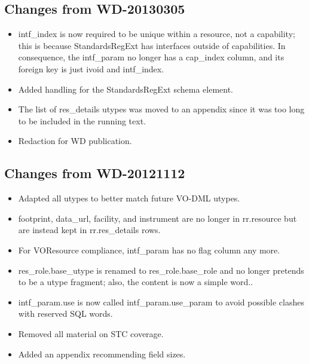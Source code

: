 \documentclass[11pt,a4paper]{ivoa}
\begin{document}
\subsection{Changes from WD-20130305}

\label{changes-20130305}

\begin{itemize}

\item intf\_index is now required to be unique within a resource, not a
capability; this is because StandardsRegExt has interfaces outside
of capabilities.  In consequence, the intf\_param no longer has a
cap\_index column, and its foreign key is just ivoid and intf\_index.{}

\item Added handling for the StandardsRegExt schema element.{}

\item The list of res\_details utypes was moved to an appendix since
it was too long to be included in the running text.{}

\item Redaction for WD publication.{}

\end{itemize}

\subsection{Changes from WD-20121112}

\label{changes-20121112}

\begin{itemize}

\item Adapted all utypes to better match future VO-DML utypes.{}

\item footprint, data\_url, facility, and instrument are no longer in rr.resource
but are instead kept in rr.res\_details rows.{}

\item For VOResource compliance, intf\_param has no flag column any more.{}

\item res\_role.base\_utype is renamed to res\_role.base\_role and no longer
pretends to be a utype fragment; also, the content is now a simple
word..{}

\item intf\_param.use is now called intf\_param.use\_param to avoid possible
clashes with reserved SQL words.{}

\item Removed all material on STC coverage.{}

\item Added an appendix recommending field sizes.{}

\end{itemize}



\end{document}
